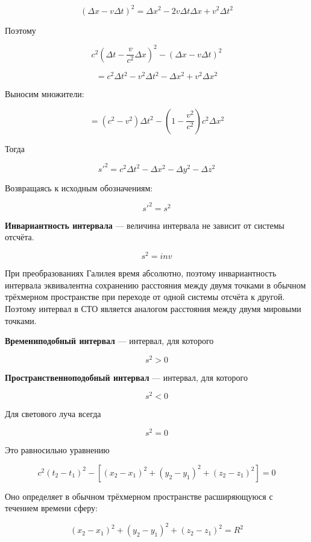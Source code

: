 \documentclass[a4paper,12pt]{article}
\begin{document}
\[
(\Delta x - v\Delta t)^2
=
\Delta x^2
-
2v \Delta t \Delta x
+
v^2 \Delta t^2
\]

Поэтому

\[
c^2
\left(
\Delta t - \frac{v}{c^2}\Delta x
\right)^2
-
(\Delta x - v\Delta t)^2
\]

\[
=
c^2 \Delta t^2
-
v^2 \Delta t^2
-
\Delta x^2
+
v^2 \Delta x^2
\]

Выносим множители:

\[
=
(c^2 - v^2)\Delta t^2
-
(1 - \frac{v^2}{c^2})c^2 \Delta x^2
\]

Тогда

\[
s'^2
=
c^2 \Delta t^2
-
\Delta x^2
-
\Delta y^2
-
\Delta z^2
\]

Возвращаясь к исходным обозначениям:

\[
s'^2 = s^2
\]

\begin{definitionbox}
\textbf{Инвариантность интервала} — величина интервала не зависит от системы отсчёта.
\end{definitionbox}

\[
s^2 = inv
\]

При преобразованиях Галилея время абсолютно, поэтому инвариантность интервала эквивалентна сохранению расстояния между двумя точками в обычном трёхмерном пространстве при переходе от одной системы отсчёта к другой. Поэтому интервал в СТО является аналогом расстояния между двумя мировыми точками.

\begin{definitionbox}
\textbf{Времениподобный интервал} — интервал, для которого
\end{definitionbox}

\[
s^2 > 0
\]

\begin{definitionbox}
\textbf{Пространственноподобный интервал} — интервал, для которого
\end{definitionbox}

\[
s^2 < 0
\]

Для светового луча всегда

\[
s^2 = 0
\]

Это равносильно уравнению

\[
c^2(t_2 - t_1)^2
-
\left[
(x_2 - x_1)^2
+
(y_2 - y_1)^2
+
(z_2 - z_1)^2
\right]
= 0
\]

Оно определяет в обычном трёхмерном пространстве расширяющуюся с течением времени сферу:

\[
(x_2 - x_1)^2
+
(y_2 - y_1)^2
+
(z_2 - z_1)^2
= R^2
\]
\end{document}
